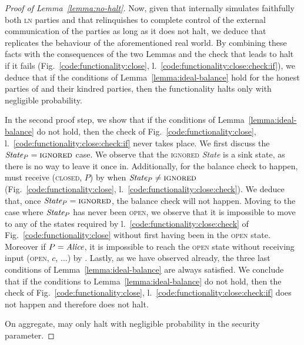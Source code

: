 \begin{proof}[Proof of Lemma~\ref{lemma:no-halt}]
  Now, given that \simulator internally simulates faithfully both \textsc{ln}
  parties and that \fchan relinquishes to \simulator complete control of the
  external communication of the parties as long as it does not halt, we deduce
  that \simulator replicates the behaviour of the aforementioned real world. By
  combining these facts with the consequences of the two Lemmas and the check
  that leads \fchan to halt if it fails (Fig.~\ref{code:functionality:close},
  l.~\ref{code:functionality:close:check:if}), we deduce that if the conditions
  of Lemma~\ref{lemma:ideal-balance} hold for the honest parties of \fchan and
  their kindred parties, then the functionality halts only with negligible
  probability.

  In the second proof step, we show that if the conditions of
  Lemma~\ref{lemma:ideal-balance} do not hold, then the check of
  Fig.~\ref{code:functionality:close},
  l.~\ref{code:functionality:close:check:if} never takes place. We first discuss
  the $\itistate_P = \textsc{ignored}$ case. We observe that the
  \textsc{ignored} \textit{State} is a sink state, as there is no way to leave
  it once in. Additionally, for the balance check to happen, \fchan must receive
  (\textsc{closed}, $P$) by \simulator when $\itistate_P \neq \textsc{ignored}$
  (Fig.~\ref{code:functionality:close},
  l.~\ref{code:functionality:close:check}). We deduce that, once $\itistate_P =
  \textsc{ignored}$, the balance check will not happen. Moving to the case where
  $\itistate_P$ has never been \textsc{open}, we observe that it is impossible
  to move to any of the states required by
  l.~\ref{code:functionality:close:check} of Fig.~\ref{code:functionality:close}
  without first having been in the \textsc{open} state. Moreover if $P =
  \mathit{Alice}$, it is impossible to reach the \textsc{open} state without receiving
  input (\textsc{open}, $c$, $\dots$) by \environment. Lastly, as we have
  observed already, the three last conditions of Lemma~\ref{lemma:ideal-balance}
  are always satisfied. We conclude that if the conditions to
  Lemma~\ref{lemma:ideal-balance} do not hold, then the check of
  Fig.~\ref{code:functionality:close},
  l.~\ref{code:functionality:close:check:if} does not happen and therefore
  \fchan does not halt.

  On aggregate, \fchan may only halt with negligible probability in the security
  parameter.
\end{proof}
